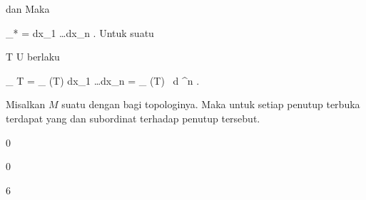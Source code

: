 {{ dan
 Maka

\mavergleichskettedisp
{\vergleichskette
{  \alpha_* \omega
}
{ =} {  dx_1 \wedge \ldots \wedge dx_n
}
{ } {
}
{ } {
}
{ } {
}
}
{}{}{.}
Untuk suatu

\mavergleichskette
{\vergleichskette
{ T
}
{ \subseteq }{ U
}
{  }{
}
{    }{
}
{   }{
}
}
{}{}{}
berlaku

\mavergleichskettedisp
{\vergleichskette
{
\int_{  T   }  \omega
}
{ =} {
\int_{ \alpha(T)  }    dx_1 \wedge \ldots \wedge dx_n
}
{ =} { \int_{ \alpha(T)  }       \,  d \lambda^n
}
{ } {
}
{ } {
}
}
{}{}{.}}{Misalkan $M$ suatu
dengan
bagi topologinya. Maka untuk setiap penutup terbuka terdapat
yang
dan subordinat terhadap penutup tersebut.}

 }



{0}

{

}
{  }



{0}

{

}
{  }



{6}

